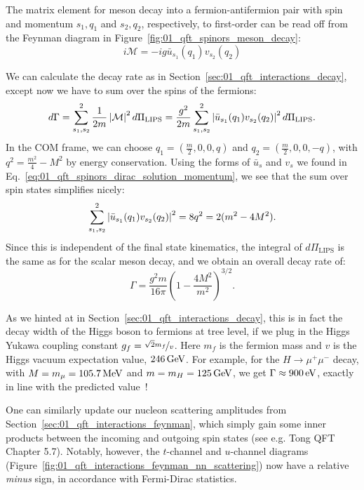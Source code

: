 The matrix element for meson decay into a fermion-antifermion pair with spin and momentum $s_1, q_1$ and $s_2, q_2$, respectively, to first-order can be read off from the Feynman diagram in Figure~\ref{fig:01_qft_spinors_meson_decay}:
\begin{equation}
	\label{eq:01_qft_spinors_meson_decay_m}
	i \mathcal M = -ig\bar u_{s_1}(q_1) v_{s_2}(q_2)
\end{equation}

We can calculate the decay rate as in Section~\ref{sec:01_qft_interactions_decay}, except now we have to sum over the spins of the fermions:
\begin{equation}
	\label{eq:01_qft_spinors_meson_decay_rate}
	d\Gamma = \sum_{s_1, s_2}^2 \frac{1}{2m} \left\lvert \mathcal M \right\rvert^2 d\Pi_{\mathrm{LIPS}} = \frac{g^2}{2m} \sum_{s_1, s_2}^2 \left\lvert \bar u_{s_1}(q_1) v_{s_2}(q_2) \right\rvert^2 d\Pi_{\mathrm{LIPS}}.
\end{equation}
In the COM frame, we can choose $q_1 = (\frac{m}{2}, 0, 0, q)$ and $q_2 = (\frac{m}{2}, 0, 0, -q)$, with $q^2 = \frac{m^2}{4} - M^2$ by energy conservation.
Using the forms of $\bar u_s$ and $v_s$ we found in Eq.~\ref{eq:01_qft_spinors_dirac_solution_momentum}, we see that the sum over spin states simplifies nicely:
\begin{equation}
	\label{eq:01_qft_spinors_meson_decay_sum}
	\sum_{s_1, s_2}^2 \left\lvert \bar u_{s_1}(q_1) v_{s_2}(q_2) \right\rvert^2 = 8q^2 = 2(m^2 - 4M^2).
\end{equation}
Since this is independent of the final state kinematics, the integral of $d\Pi_{\mathrm{LIPS}}$ is the same as for the scalar meson decay, and we obtain an overall decay rate of:
\begin{equation}
	\label{eq:01_qft_spinors_meson_decay_rate_final}
	\Gamma = \frac{g^2m}{16\pi} \left(1 - \frac{4M^2}{m^2}\right)^{3/2}.
\end{equation}

As we hinted at in Section~\ref{sec:01_qft_interactions_decay}, this is in fact the decay width of the Higgs boson to fermions at tree level, if we plug in the Higgs Yukawa coupling constant $g_f = \cnicefrac{\sqrt{2} m_f}{v}$.
Here $m_f$ is the fermion mass and $v$ is the Higgs vacuum expectation value, $246\,\text{Ge\hspace{-.08em}V}$.
For example, for the $H\to \mu^+\mu^-$ decay, with $M = m_\mu = 105.7\,\text{Me\hspace{-.08em}V}$ and $m = m_H = 125\,\text{Ge\hspace{-.08em}V}$, we get $\Gamma \approx 900\,\text{e\hspace{-.08em}V}$, exactly in line with the predicted value~\cite{Denner:2011mq}!

One can similarly update our nucleon scattering amplitudes from Section~\ref{sec:01_qft_interactions_feynman}, which simply gain some inner products between the incoming and outgoing spin states (see e.g. Tong QFT~\cite{TongQFT} Chapter 5.7).
Notably, however, the $t$-channel and $u$-channel diagrams (Figure~\ref{fig:01_qft_interactions_feynman_nn_scattering}) now have a relative \textit{minus} sign, in accordance with Fermi-Dirac statistics.


